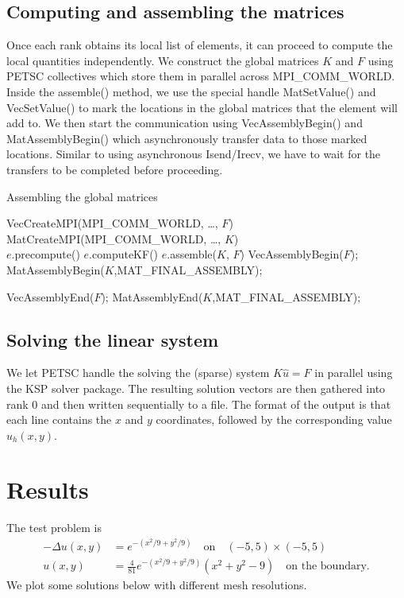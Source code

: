 \documentclass[12pt]{extreport}
\begin{document}
\subsection*{Computing and assembling the matrices}
Once each rank obtains its local list of elements, it can proceed to compute the local quantities independently. We construct the global matrices $K$ and $F$ using PETSC collectives which store them in parallel across MPI\_COMM\_WORLD. Inside the assemble() method, we use the special handle MatSetValue() and VecSetValue() to mark the locations in the global matrices that the element will add to. We then start the communication using VecAssemblyBegin() and MatAssemblyBegin() which asynchronously transfer data to those marked locations. Similar to using asynchronous Isend/Irecv, we have to wait for the transfers to be completed before proceeding.

\begin{algorithm}
  \caption{Assembling the global matrices}
  \begin{algorithmic}
    \State VecCreateMPI(MPI\_COMM\_WORLD, \ldots, $F$)
    \State MatCreateMPI(MPI\_COMM\_WORLD, \ldots, $K$) \\
    \State $e$.precompute() 
    \State $e$.computeKF() 
    \State $e$.assemble($K$, $F$)
    \EndFor
    \State VecAssemblyBegin($F$);
    \State MatAssemblyBegin($K$,MAT\_FINAL\_ASSEMBLY);

    \State VecAssemblyEnd($F$);
    \State MatAssemblyEnd($K$,MAT\_FINAL\_ASSEMBLY);
  \end{algorithmic}
\end{algorithm}

\subsection*{Solving the linear system}
We let PETSC handle the solving the (sparse) system $K\hat{u} = F$ in parallel using the KSP solver package. The resulting solution vectors are then gathered into rank 0 and then written sequentially to a file. The format of the output is that each line contains the $x$ and $y$ coordinates, followed by the corresponding value $u_h(x,y)$.

\section*{Results}
The test problem is
\begin{align}
  -\Delta u(x,y) &= e^{-(x^2/9 + y^2/9)} \quad \text{on} \quad (-5,5) \times (-5,5) \\
  u(x,y) &= \frac{4}{81}e^{-(x^2/9+y^2/9)}(x^2 + y^2 - 9) \quad \text{on the boundary}.
\end{align}
We plot some solutions below with different mesh resolutions.
\end{document}
